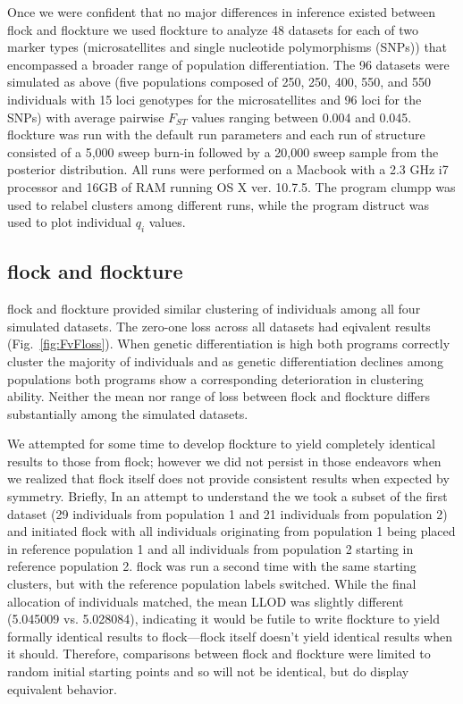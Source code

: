 Once we were confident that no major differences in inference existed between 
{\sc flock} and {\sc flockture} we used {\sc flockture} to analyze 48 datasets for each of two marker types 
(microsatellites and single nucleotide polymorphisms (SNPs))  that encompassed a broader 
range of population differentiation. The 96 datasets were simulated as above (five populations 
composed of 250, 250, 400, 550, and 550 individuals with 15 loci genotypes for the microsatellites
and 96 loci for the SNPs)
with average pairwise $F_{ST}$ values ranging between 0.004 and 0.045. 
 {\sc flockture} was run with the default run parameters and each run of 
{\sc structure} consisted of a 5,000 sweep burn-in followed by a 20,000 sweep sample
from the posterior distribution. All runs were performed on a Macbook with a 2.3 GHz i7 processor
and 16GB of RAM running OS X ver. 10.7.5. The program {\sc clumpp} \citep{Jak&Ros2007} 
was used to relabel clusters among different runs,
while the program {\sc distruct} \citep{Rosenberg2004} was used to plot individual \textit{$q_i$} values.

\subsection*{{\sc flock} and {\sc flockture}} 
{\sc flock} and {\sc flockture} provided similar clustering of individuals among all four 
simulated datasets. The zero-one loss across all datasets had eqivalent results (Fig.~\ref{fig:FvFloss}).
When genetic differentiation is high both programs correctly cluster the majority of individuals and 
as genetic differentiation declines among populations both programs show a corresponding deterioration in 
clustering ability. Neither the mean nor range of loss between {\sc flock} and {\sc flockture} differs
substantially among the simulated datasets.  

We attempted for some time to develop {\sc flockture} to yield
completely identical results to those from {\sc flock}; however we did not
persist in those endeavors when we realized that {\sc flock} itself does
not provide consistent results when expected by symmetry.  Briefly, In an attempt to understand the 
we took a subset of the 
first dataset (29 individuals from population 1 and 21 individuals from population 2) and initiated 
{\sc flock} with all individuals originating from population 1 being placed in reference population 1 and all 
individuals from population 2 starting in reference population 2. {\sc flock} was run a second time
with the same starting clusters, but with the reference population labels switched. While the final allocation
of individuals matched, the mean LLOD was slightly different (5.045009 vs. 5.028084), indicating it would
be futile to write {\sc flockture} to yield formally identical results to {\sc flock}---{\sc flock} itself
doesn't yield identical results when it should. Therefore, comparisons
between {\sc flock} and {\sc flockture} were limited to random initial starting points and so will not 
be identical, but do display equivalent behavior. 

